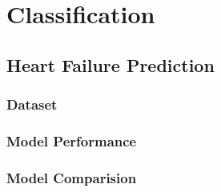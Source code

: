 \chapter{Classification}
\lipsum[2-2]

\section{Heart Failure Prediction}
\lipsum[2-2]

\subsection{Dataset}
\lipsum[2-2]

\subsection{Model Performance}
\lipsum[2-2]

\subsection{Model Comparision}
\lipsum[2-2]


